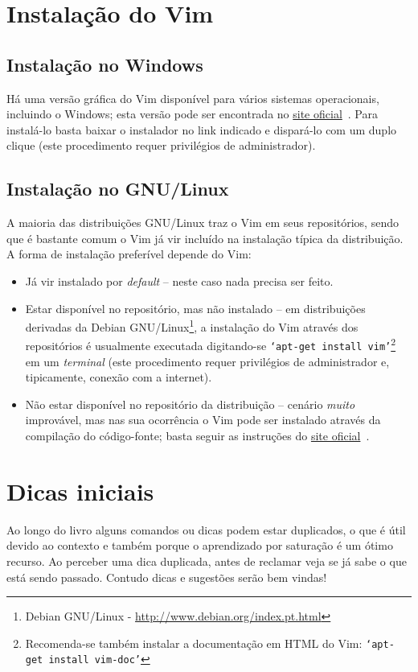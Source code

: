 \section{Instalação do Vim}
%
\subsection{Instalação no Windows}
%
Há uma versão gráfica do Vim disponível para vários sistemas operacionais, incluindo o Windows;
esta versão pode ser encontrada no \href{http://www.vim.org/download.php}{site
oficial}~\cite{SiteOficialDownloads}. 
Para instalá-lo basta baixar o instalador no link indicado e dispará-lo com um
duplo clique (este procedimento requer privilégios de administrador).

\subsection{Instalação no GNU/Linux}
%
A maioria das distribuições GNU/Linux traz o Vim em seus repositórios, sendo
que é bastante comum o Vim já vir incluído na instalação típica da distribuição.
A forma de instalação preferível depende do Vim:
\begin{itemize}
\item Já vir instalado por {\em default} -- neste caso nada precisa ser feito.

\item Estar disponível no repositório, mas não instalado -- em distribuições
derivadas da Debian GNU/Linux\footnote{Debian GNU/Linux - \url{http://www.debian.org/index.pt.html}},
a instalação do Vim através dos repositórios é usualmente executada
digitando-se {\tt `apt-get install vim'}\footnote{Recomenda-se também instalar
a documentação em HTML do Vim: {\tt `apt-get install vim-doc'}} em um {\em terminal} (este procedimento
requer privilégios de administrador e, tipicamente, conexão com a internet).

\item Não estar disponível no repositório da distribuição -- cenário {\em muito}
improvável, mas nas sua ocorrência o Vim pode ser instalado através da compilação do
código-fonte; basta seguir as instruções do \href{http://www.vim.org/download.php}{site oficial}~\cite{SiteOficialDownloads}.

\end{itemize}

\section{Dicas iniciais}\label{Dicas iniciais}
%
Ao longo do livro alguns comandos ou dicas podem estar duplicados, o que
é útil devido ao contexto e também porque o aprendizado por saturação
é um ótimo recurso. Ao perceber uma dica duplicada, antes de
reclamar veja se já sabe o que está sendo passado. Contudo dicas e sugestões serão bem vindas! 

